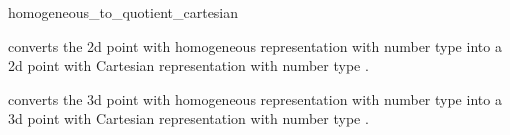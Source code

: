\begin{ccRefFunction}{homogeneous_to_quotient_cartesian}


        {converts the 2d point  with homogeneous representation  
         with number type  into a 2d point with Cartesian 
         representation with number type .}

        {converts the 3d point  with homogeneous representation  
         with number type  into a 3d point with Cartesian 
         representation with number type .}
\end{ccRefFunction}

